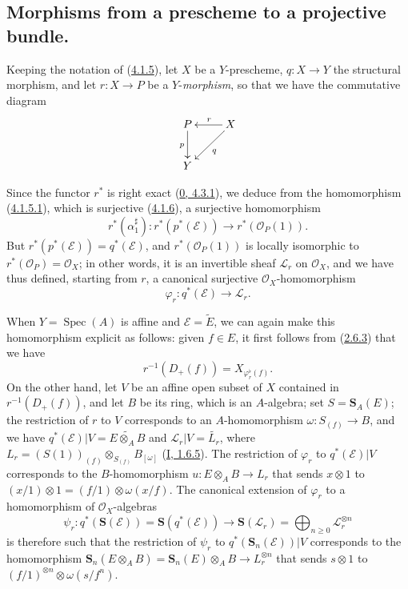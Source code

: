 \subsection{Morphisms from a prescheme to a projective bundle.}
\label{subsection:II.4.2}

\begin{env}[4.2.1]
\label{II.4.2.1}
Keeping the notation of (\hyperref[II.4.1.5]{4.1.5}), let $X$ be a
$Y$-prescheme, $q:X\to Y$ the structural morphism, and let $r:X\to P$ be a
$Y$-\emph{morphism}, so that we have the commutative diagram
\[
  \xymatrix{
    P \ar[d]_p & X \ar[l]_r \ar[dl]^q
    \\Y
  }
\]


Since the functor $r^*$ is right exact
(\hyperref[0.4.3.1]{0, 4.3.1}), we deduce from the homomorphism
(\hyperref[II.4.1.5.1]{4.1.5.1}), which is surjective
(\hyperref[II.4.1.6]{4.1.6}), a surjective homomorphism
\[
  r^*(\alpha_1^\sharp):r^*(p^*(\mathcal{E}))\longrightarrow
  r^*(\mathcal{O}_P(1)).
\]
But $r^*(p^*(\mathcal{E}))=q^*(\mathcal{E})$, and
$r^*(\mathcal{O}_P(1))$ is locally isomorphic to
$r^*(\mathcal{O}_P)=\mathcal{O}_X$; in other words, it is an invertible
sheaf $\mathcal{L}_r$ on $\mathcal{O}_X$, and we have thus defined, starting
from $r$, a canonical surjective $\mathcal{O}_X$-homomorphism
\[
\label{II.4.2.1.1}
  \varphi_r:q^*(\mathcal{E})\longrightarrow\mathcal{L}_r.
\tag{4.2.1.1}
\]

When $Y=\operatorname{Spec}(A)$ is affine and
$\mathcal{E}=\widetilde{E}$, we can again make this homomorphism explicit as
follows: given $f\in E$, it first follows from
(\hyperref[II.2.6.3]{2.6.3}) that we have
\[
\label{II.4.2.1.2}
  r^{-1}(D_+(f))=X_{\varphi_r^\flat(f)}.
\tag{4.2.1.2}
\]
On the other hand, let $V$ be an affine open subset of $X$ contained in
$r^{-1}(D_+(f))$, and let $B$ be its ring, which is an $A$-algebra; set
$S=\mathbf{S}_A(E)$; the restriction of $r$ to $V$ corresponds to an
$A$-homomorphism $\omega:S_{(f)}\to B$, and we have
$q^*(\mathcal{E})|V=\widetilde{E\otimes_A B}$ and
$\mathcal{L}_r|V=\widetilde{L_r}$, where
$L_r=(S(1))_{(f)}\otimes_{S_{(f)}}B_{[\omega]}$
(\hyperref[I.1.6.5]{I, 1.6.5}). The restriction of $\varphi_r$ to
$q^*(\mathcal{E})|V$ corresponds to the $B$-homomorphism
$u:E\otimes_A B\to L_r$ that sends $x\otimes1$ to
$(x/1)\otimes1=(f/1)\otimes\omega(x/f)$. The canonical extension of
$\varphi_r$ to a homomorphism of $\mathcal{O}_X$-algebras
\[
  \psi_r:q^*(\mathbf{S}(\mathcal{E}))=
  \mathbf{S}(q^*(\mathcal{E}))\longrightarrow
  \mathbf{S}(\mathcal{L}_r)=\bigoplus_{n\geq0}\mathcal{L}_r^{\otimes n}
\]
is therefore such that the restriction of $\psi_r$ to
$q^*(\mathbf{S}_n(\mathcal{E}))|V$ corresponds to the homomorphism
$\mathbf{S}_n(E\otimes_A B)=\mathbf{S}_n(E)\otimes_A B\to L_r^{\otimes n}$
that sends $s\otimes1$ to
$(f/1)^{\otimes n}\otimes\omega(s/f^n)$.
\end{env}

